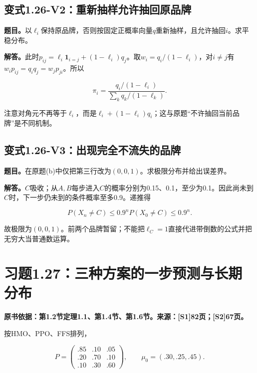 \documentclass[
  11pt,
  a4paper,
  UTF8,
  fontset=fandol]{ctexart}
\begin{document}
\subsection{变式1.26-V2：重新抽样允许抽回原品牌}\label{ux53d8ux5f0f1.26-v2ux91cdux65b0ux62bdux6837ux5141ux8bb8ux62bdux56deux539fux54c1ux724c}

\textbf{题目。}以\(\ell_i\)保持原品牌，否则按固定正概率向量\(q\)重新抽样，且允许抽回\(i\)。求平稳分布。

\textbf{解答。}此时\(p_{ij}=\ell_i\boldsymbol1_{i=j}+(1-\ell_i)q_j\)。取\(w_i=q_i/(1-\ell_i)\)，对\(i\ne j\)有\(w_ip_{ij}=q_iq_j=w_jp_{ji}\)。所以

\[
\boxed{\pi_i=\frac{q_i/(1-\ell_i)}{\sum_kq_k/(1-\ell_k)}.}
\]

注意对角元不再等于\(\ell_i\)，而是\(\ell_i+(1-\ell_i)q_i\)；这与原题``不许抽回当前品牌''是不同机制。

\subsection{变式1.26-V3：出现完全不流失的品牌}\label{ux53d8ux5f0f1.26-v3ux51faux73b0ux5b8cux5168ux4e0dux6d41ux5931ux7684ux54c1ux724c}

\textbf{题目。}在原题(b)中仅把第三行改为\((0,0,1)\)。求极限分布并给出误差界。

\textbf{解答。}\(C\)吸收；从\(A,B\)每步进入\(C\)的概率分别为0.15、0.1，至少为0.1。因此尚未到\(C\)时，下一步仍未到的条件概率至多0.9。递推得

\[
P(X_n\ne C)\le0.9^nP(X_0\ne C)\le0.9^n.
\]

故极限为\((0,0,1)\)。前两个品牌暂留；不能把\(\ell_C=1\)直接代进带倒数的公式并把无穷大当普通数运算。

\section{习题1.27：三种方案的一步预测与长期分布}\label{ux4e60ux98981.27ux4e09ux79cdux65b9ux6848ux7684ux4e00ux6b65ux9884ux6d4bux4e0eux957fux671fux5206ux5e03}

\textbf{原书依据：第1.2节定理1.1、第1.4节、第1.6节。来源：{[}S1{]}82页；{[}S2{]}67页。}

按HMO、PPO、FFS排列，

\[
P=\begin{pmatrix}.85&.10&.05\\.20&.70&.10\\.10&.30&.60\end{pmatrix},
\qquad \mu_0=(.30,.25,.45).
\]
\end{document}
